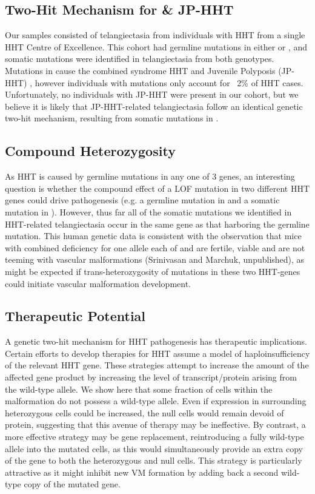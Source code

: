 \subsection{Two-Hit Mechanism for  \& JP-HHT}
Our samples consisted of telangiectasia from individuals with HHT from a single HHT Centre of Excellence.  This cohort had germline mutations in either  or , and somatic mutations were identified in telangiectasia from both genotypes. Mutations in  cause the combined syndrome HHT and Juvenile Polyposis (JP-HHT) , however individuals with  mutations only account for ~2\% of HHT cases.\citep{gallione2004} Unfortunately, no individuals with JP-HHT were present in our cohort, but we believe it is likely that JP-HHT-related telangiectasia follow an identical genetic two-hit mechanism, resulting from somatic mutations in . 

\subsection{Compound Heterozygosity}
As HHT is caused by germline mutations in any one of 3 genes, an interesting question is whether the compound effect of a LOF mutation in two different HHT genes could drive pathogenesis (e.g. a germline mutation in  and a somatic mutation in ). However, thus far all of the somatic mutations we identified in HHT-related telangiectasia occur in the same gene as that harboring the germline mutation.   This human genetic data is consistent with the observation that mice with combined deficiency for one allele each of  and  are fertile, viable and are not teeming with vascular malformations\citep{eleftheriou2016} (Srinivasan and Marchuk, unpublished), as might be expected if trans-heterozygosity of mutations in these two HHT-genes could initiate vascular malformation development.
	
\subsection{Therapeutic Potential}	
A genetic two-hit mechanism for HHT pathogenesis has therapeutic implications. Certain efforts to develop therapies for HHT assume a model of haploinsufficiency of the relevant HHT gene.  These strategies attempt to increase the amount of the affected gene product by increasing the level of transcript/protein arising from the wild-type allele.\citep{ruizllorente2017} We show here that some fraction of cells within the malformation do not possess a wild-type allele.  Even if expression in surrounding heterozygous cells could be increased, the null cells would remain devoid of protein, suggesting that this avenue of therapy may be ineffective.  By contrast, a more effective strategy may be gene replacement, reintroducing a fully wild-type allele into the mutated cells\citep{seki2003}, as this would simultaneously provide an extra copy of the gene to both the heterozygous and null cells.   This strategy is particularly attractive as it might inhibit new VM formation by adding back a second wild-type copy of the mutated gene.


